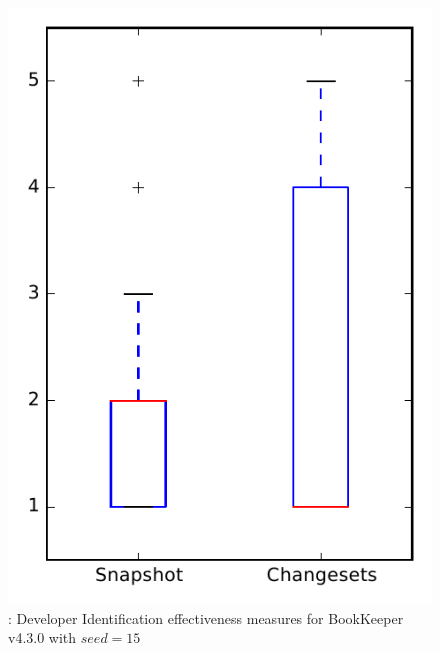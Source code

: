 
\begin{figure}
\centering
\includegraphics[height=0.4\textheight]{figures/dit_seed/rq1_bookkeeper_15}
\caption{\rtwo: Developer Identification effectiveness measures for BookKeeper v4.3.0 with $seed=15$}
\label{fig:dit_seed:rq1:bookkeeper}
\end{figure}
